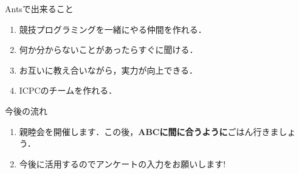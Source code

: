 \documentclass[12pt, unicode]{beamer}
\begin{document}
  \begin{frame}{Antsで出来ること}
    \begin{enumerate}
      \item 競技プログラミングを一緒にやる仲間を作れる．\pause
      \item 何か分からないことがあったらすぐに聞ける． \pause
      \item お互いに教え合いながら，実力が向上できる．\pause
      \item ICPCのチームを作れる．
    \end{enumerate}
  \end{frame}
  \begin{frame}{今後の流れ}
    \begin{enumerate}
      \item 親睦会を開催します．この後，\textbf{ABCに間に合うように}ごはん行きましょう． \pause
      \item 今後に活用するのでアンケートの入力をお願いします!
    \end{enumerate}
  \end{frame}
\end{document}
